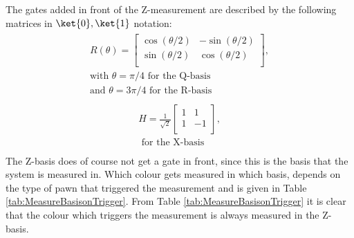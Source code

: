 \documentclass[final,5p,times,twocolumn,authoryear]{elsarticle}
\begin{document}
The gates added in front of the Z-measurement are described by the following matrices in $\ket{0},\ket{1}$ notation:
\begin{align}
\begin{split}
    R(\theta)=\left[\begin{matrix} \cos(\theta/2) & -\sin(\theta/2) \\ \sin(\theta/2) & \cos(\theta/2) \\ \end{matrix}\right], \\
    \text{with } \theta=\pi/4 \text{ for the Q-basis} \\
    \text{and } \theta = 3\pi/4 \text{ for the R-basis}
\end{split}
\label{eq:Rtheta}
\end{align}
\begin{align}
\begin{split}
    H=\frac{1}{\sqrt{2}}\left[\begin{matrix}1 & 1 \\ 1 & -1 \\ \end{matrix}\right], \\
    \text{ for the X-basis} \\
\end{split}
\label{eq:Heq}
\end{align}
The Z-basis does of course not get a gate in front, since this is the basis that the system is measured in. Which colour gets measured in which basis, depends on the type of pawn that triggered the measurement and is given in Table \ref{tab:MeasureBasisonTrigger}. From Table \ref{tab:MeasureBasisonTrigger} it is clear that the colour which triggers the measurement is always measured in the Z-basis.
\end{document}
